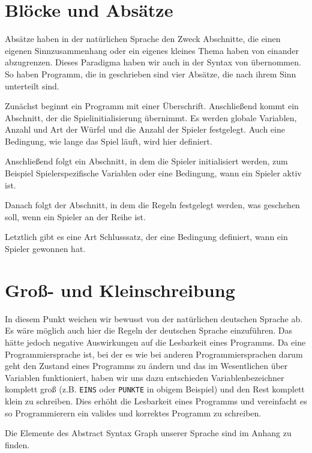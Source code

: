     \section{Blöcke und Absätze}
    \label{sec:blocke_und_absatze}
     Absätze haben in der natürlichen Sprache den Zweck Abschnitte, die einen eigenen Sinnzusammenhang oder ein eigenes kleines Thema haben von einander abzugrenzen. Dieses Paradigma haben wir auch in der Syntax von \dg übernommen. So haben Programm, die in \dg geschrieben sind vier Absätze, die nach ihrem Sinn unterteilt sind.
 
     Zunächst beginnt ein Programm mit einer Überschrift. Anschließend kommt ein Abschnitt, der die Spielinitialisierung übernimmt. Es werden globale Variablen, Anzahl und Art der Würfel und die Anzahl der Spieler festgelegt. Auch eine Bedingung, wie lange das Spiel läuft, wird hier definiert.
 
     Anschließend folgt ein Abschnitt, in dem die Spieler initialisiert werden, zum Beispiel Spielerspezifische Variablen oder eine Bedingung, wann ein Spieler aktiv ist.
 
     Danach folgt der Abschnitt, in dem die Regeln festgelegt werden, was geschehen soll, wenn ein Spieler an der Reihe ist.
 
     Letztlich gibt es eine Art Schlusssatz, der eine Bedingung definiert, wann ein Spieler gewonnen hat.
 
    \section{Groß- und Kleinschreibung}
    \label{sec:gross_und_kleinschreibung}
     In diesem Punkt weichen wir bewusst von der natürlichen deutschen Sprache ab. Es wäre möglich auch hier die Regeln der deutschen Sprache einzuführen. Das hätte jedoch negative Auswirkungen auf die Lesbarkeit eines Programms. Da \dg eine Programmiersprache ist, bei der es wie bei anderen Programmiersprachen darum geht den Zustand eines Programms zu ändern und das im Wesentlichen über Variablen funktioniert, haben wir uns dazu entschieden Variablenbezeichner komplett groß (z.B. \texttt{EINS} oder \texttt{PUNKTE} in obigem Beispiel) und den Rest komplett klein zu schreiben. Dies erhöht die Lesbarkeit eines Programms und vereinfacht es so Programmierern ein valides und korrektes Programm zu schreiben.
	
    Die Elemente des Abstract Syntax Graph unserer Sprache sind im Anhang zu finden. 